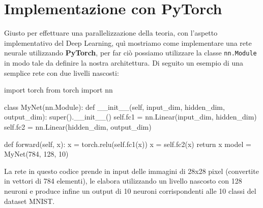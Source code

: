 \section{Implementazione con PyTorch}
Giusto per effettuare una parallelizzazione della teoria, con l'aspetto implementativo del Deep Learning, quì mostriamo come implementare una rete neurale utilizzando \textbf{PyTorch}, per far ciò possiamo utilizzare la classe \texttt{nn.Module} in modo tale da definire la nostra architettura. Di seguito un esempio di una semplice rete con due livelli nascosti:
\\
\begin{python}[frame=trBL]
    import torch
    from torch import nn

    class MyNet(nn.Module):
        def __init__(self, input_dim, hidden_dim, output_dim):
            super().__init__()
            self.fc1 = nn.Linear(input_dim, hidden_dim)
            self.fc2 = nn.Linear(hidden_dim, output_dim)
    
        def forward(self, x):
            x = torch.relu(self.fc1(x))
            x = self.fc2(x)
            return x
    model = MyNet(784, 128, 10)
\end{python}
\vspace{0.5em}
La rete in questo codice prende in input delle immagini di 28x28 pixel (convertite in vettori di 784 elementi), le elabora utilizzando un livello nascosto con 128 neuroni e produce infine un output di 10 neuroni corrispondenti alle 10 classi del dataset MNIST.